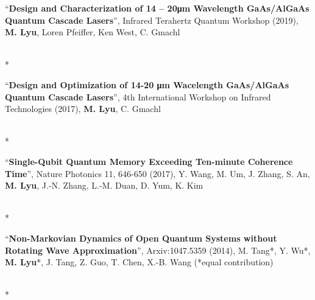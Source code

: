 \documentclass[localFont,alternative]{yaac-another-awesome-cv}
\begin{document}
\newcommand\publication[3]{
  \begin{minipage}[t]{\dimexpr(\linewidth) - 1.5em}
    ``\textbf{#1}'', #2, #3
  \end{minipage}
  \\*
}
\publication{Design and Characterization of 14 – 20μm Wavelength GaAs/AlGaAs
Quantum Cascade Lasers}{Infrared Terahertz Quantum Workshop (2019)}
{\textbf{M. Lyu}, Loren Pfeiffer, Ken West, C. Gmachl}
\publication{Design and Optimization of 14-20 μm Wacelength GaAs/AlGaAs 
  Quantum Cascade Lasers}{4th International Workshop on Infrared
  Technologies (2017)}{\textbf{M. Lyu}, C. Gmachl}
\publication{Single-Qubit Quantum Memory Exceeding Ten-minute Coherence Time}
  {Nature Photonics 11, 646-650 (2017)}{Y. Wang, M. Um, J. Zhang, S. An, 
    \textbf{M. Lyu}, J.-N. Zhang, L.-M. Duan, D. Yum, K. Kim}
\publication{Non-Markovian Dynamics of Open Quantum Systems without Rotating 
  Wave Approximation}{Arxiv:1047.5359 (2014)}{M. Tang*, Y. Wu*, 
  \textbf{M. Lyu}*, J. Tang, Z. Guo, T. Chen, X.-B. Wang 
  (*equal contribution)}

\end{document}
